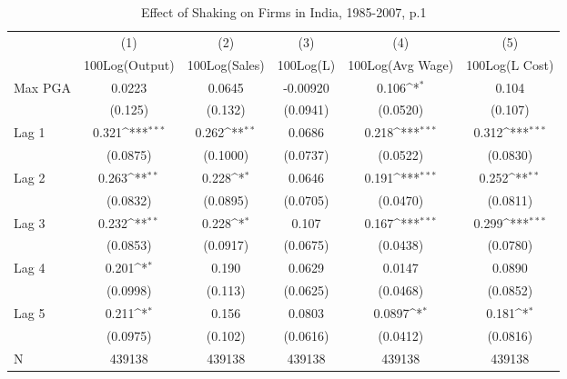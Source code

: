 \begin{table}[htbp]\centering
\def\sym#1{\ifmmode^{#1}\else\(^{#1}\)\fi}
\caption{Effect of Shaking on Firms in India, 1985-2007, p.1}
\begin{tabular}{l*{5}{c}}
\toprule
                &\multicolumn{1}{c}{(1)}&\multicolumn{1}{c}{(2)}&\multicolumn{1}{c}{(3)}&\multicolumn{1}{c}{(4)}&\multicolumn{1}{c}{(5)}\\
                &\multicolumn{1}{c}{100Log(Output)}&\multicolumn{1}{c}{100Log(Sales)}&\multicolumn{1}{c}{100Log(L)}&\multicolumn{1}{c}{100Log(Avg Wage)}&\multicolumn{1}{c}{100Log(L Cost)}\\
\midrule
Max PGA         &   0.0223         &   0.0645         & -0.00920         &    0.106\sym{*}  &    0.104         \\
                &  (0.125)         &  (0.132)         & (0.0941)         & (0.0520)         &  (0.107)         \\
\addlinespace
Lag 1           &    0.321\sym{***}&    0.262\sym{**} &   0.0686         &    0.218\sym{***}&    0.312\sym{***}\\
                & (0.0875)         & (0.1000)         & (0.0737)         & (0.0522)         & (0.0830)         \\
\addlinespace
Lag 2           &    0.263\sym{**} &    0.228\sym{*}  &   0.0646         &    0.191\sym{***}&    0.252\sym{**} \\
                & (0.0832)         & (0.0895)         & (0.0705)         & (0.0470)         & (0.0811)         \\
\addlinespace
Lag 3           &    0.232\sym{**} &    0.228\sym{*}  &    0.107         &    0.167\sym{***}&    0.299\sym{***}\\
                & (0.0853)         & (0.0917)         & (0.0675)         & (0.0438)         & (0.0780)         \\
\addlinespace
Lag 4           &    0.201\sym{*}  &    0.190         &   0.0629         &   0.0147         &   0.0890         \\
                & (0.0998)         &  (0.113)         & (0.0625)         & (0.0468)         & (0.0852)         \\
\addlinespace
Lag 5           &    0.211\sym{*}  &    0.156         &   0.0803         &   0.0897\sym{*}  &    0.181\sym{*}  \\
                & (0.0975)         &  (0.102)         & (0.0616)         & (0.0412)         & (0.0816)         \\
\midrule
N               &   439138         &   439138         &   439138         &   439138         &   439138         \\

\end{tabular}
\end{table}
